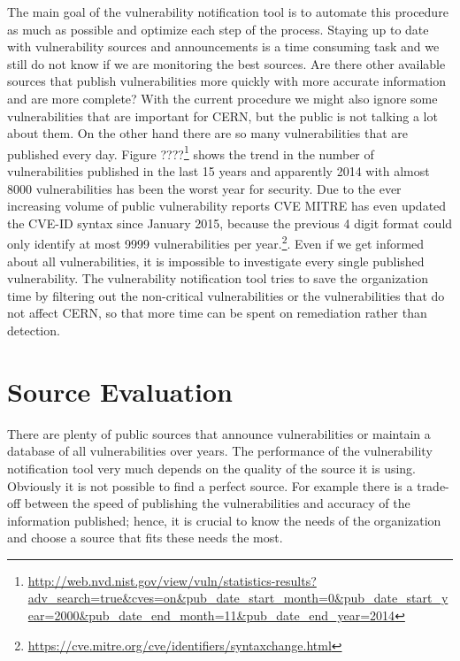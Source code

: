 The main goal of the vulnerability notification tool is to automate this procedure as much as possible and optimize each step of the process. 
Staying up to date with vulnerability sources and announcements is a time consuming task and we still do not know if we are monitoring the best sources. Are there other available sources that publish vulnerabilities more quickly with more accurate information and are more complete? With the current procedure we might also ignore some vulnerabilities that are important for CERN, but the public is not talking a lot about them. 
On the other hand there are so many vulnerabilities that are published every day. Figure ????\footnote{\url{http://web.nvd.nist.gov/view/vuln/statistics-results?adv_search=true&cves=on&pub_date_start_month=0&pub_date_start_year=2000&pub_date_end_month=11&pub_date_end_year=2014}} shows the trend in the number of vulnerabilities published in the last 15 years and apparently 2014 with almost 8000 vulnerabilities has been the worst year for security. Due to the ever increasing volume of public vulnerability reports CVE MITRE has even updated the CVE-ID syntax since January 2015, because the previous 4 digit format could only identify at most 9999 vulnerabilities per year.\footnote{\url {https://cve.mitre.org/cve/identifiers/syntaxchange.html}}. Even if we get informed about all vulnerabilities, it is impossible to investigate every single published vulnerability. The vulnerability notification tool tries to save the organization time by filtering out the non-critical vulnerabilities or the vulnerabilities that do not affect CERN, so that more time can be spent on remediation rather than detection.

%

\section{Source Evaluation}

There are plenty of public sources that announce vulnerabilities or maintain a database of all vulnerabilities over years. The performance of the vulnerability notification tool very much depends on the quality of the source it is using. Obviously it is not possible to find a perfect source. For example there is a trade-off between the speed of publishing the vulnerabilities and accuracy of the information published; hence, it is crucial to know the needs of the organization and choose a source that fits these needs the most.

